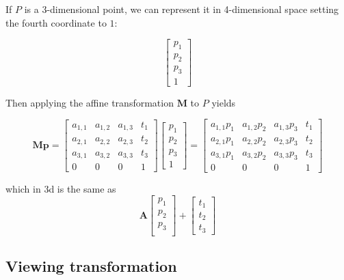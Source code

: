 \documentclass{scrartcl}
\begin{document}
    If $P$ is a 3-dimensional point, we can represent it in 4-dimensional space setting the fourth coordinate to $1$:

    \[
    \begin{bmatrix}
        p_1\\
        p_2\\
        p_3 \\
        1
    \end{bmatrix}
    \]

    Then applying the affine transformation $\mathbf{M}$ to $P$ yields

    \[
    \mathbf{M}\mathbf{p} =
    \begin{bmatrix}
        a_{1,1} & a_{1,2} & a_{1,3} & t_1 \\
        a_{2,1} & a_{2,2} & a_{2,3} & t_2 \\
        a_{3,1} & a_{3,2} & a_{3,3} & t_3 \\
        0 & 0 & 0 & 1
    \end{bmatrix}
    \begin{bmatrix}
        p_1\\
        p_2\\
        p_3\\
        1
    \end{bmatrix} =
    \begin{bmatrix}
        a_{1,1}p_1 & a_{1,2}p_2 & a_{1,3}p_3 & t_1 \\
        a_{2,1}p_1 & a_{2,2}p_2 & a_{2,3}p_3 & t_2 \\
        a_{3,1}p_1 & a_{3,2}p_2 & a_{3,3}p_3 & t_3 \\
        0 & 0 & 0 & 1
    \end{bmatrix}
    \]

    which in 3d is the same as
    \[
    \mathbf{A}
    \begin{bmatrix}
        p_1\\
        p_2\\
        p_3 \\
    \end{bmatrix} +
    \begin{bmatrix}
        t_1\\
        t_2\\
        t_3
    \end{bmatrix}
    \]



    \subsection{Viewing transformation}
\end{document}
